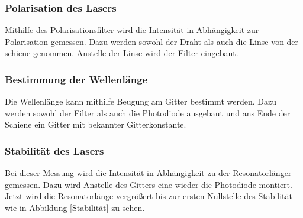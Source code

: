 \subsubsection{Polarisation des Lasers}
Mithilfe des Polarisationsfilter wird die Intensität in Abhängigkeit zur Polarisation gemessen. Dazu werden sowohl der Draht als auch die Linse von der schiene genommen. Anstelle der Linse wird der Filter eingebaut.
\subsubsection{Bestimmung der Wellenlänge}

Die Wellenlänge kann mithilfe Beugung am Gitter bestimmt werden. Dazu werden sowohl der Filter als auch die Photodiode ausgebaut und ans Ende der Schiene ein Gitter mit bekannter Gitterkonstante.\\
\subsubsection{Stabilität des Lasers}
Bei dieser Messung wird die Intensität in Abhängigkeit zu der Resonatorlänger gemessen. Dazu wird Anstelle des Gitters eine wieder die Photodiode montiert. Jetzt wird die Resonatorlänge vergrößert bis zur ersten Nullstelle des Stabilität wie in Abbildung \ref{Stabilität} zu sehen.

